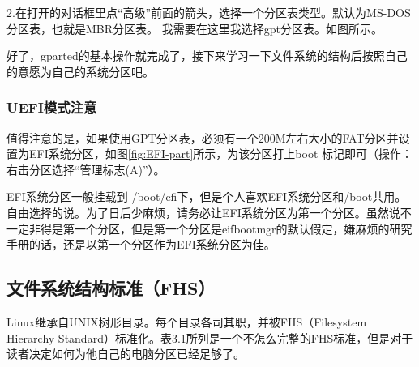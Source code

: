 \indent2.在打开的对话框里点“高级”前面的箭头，选择一个分区表类型。默认为MS-DOS分区表，也就是MBR分区表。
我需要在这里我选择gpt分区表。如图\thefigure{}所示。

好了，gparted的基本操作就完成了，接下来学习一下文件系统的结构后按照自己的意愿为自己的系统分区吧。

\FloatBarrier

\subsubsection*{UEFI模式注意}

值得注意的是，如果使用GPT分区表，必须有一个200M左右大小的FAT分区并设置为EFI系统分区，如图\ref{fig:EFI-part}所示，为该分区打上boot 标记即可（操作：右击分区选择“管理标志(A)”）。

EFI系统分区一般挂载到 /boot/efi下，但是个人喜欢EFI系统分区和/boot共用。自由选择的说。为了日后少麻烦，请务必让EFI系统分区为第一个分区。虽然说不一定非得是第一个分区，但是第一个分区是eifbootmgr的默认假定，嫌麻烦的研究手册的话，还是以第一个分区作为EFI系统分区为佳。


\FloatBarrier

\subsection{文件系统结构标准（FHS）}

Linux继承自UNIX树形目录。每个目录各司其职，并被FHS（Filesystem Hierarchy Standard）标准化。表3.1所列是一个不怎么完整的FHS标准，但是对于读者决定如何为他自己的电脑分区已经足够了。

